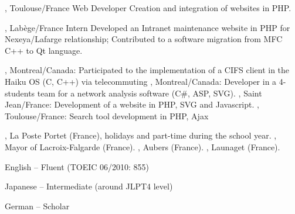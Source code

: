 \documentclass[english]{ecv}
\begin{document}
\begin{ecv}
                 {, Toulouse/France}
                 {Web Developer}
                 {Creation and integration of websites in PHP.
                 }

                 {, Lab\`ege/France}
                 {Intern
                 }
                 {Developed an Intranet maintenance website in PHP for Nexeya/Lafarge
                  relationship; Contributed to a software migration from MFC C++
                  to Qt language.
                 }

                 {, Montreal/Canada: Participated
                  to the implementation of a CIFS client in the Haiku OS (C, C++)
                  via telecommuting}
                 {, Montreal/Canada:
                 Developer in a 4-students team for a network analysis software
                 (C\#, ASP, SVG).
                 }
                 {, Saint Jean/France: Development of a
                 website in PHP, SVG and Javascript.
                 }
                 {, Toulouse/France:
                 Search tool development in PHP, Ajax
                 }

 {, La Poste Portet (France), holidays and
part-time during the school year.}
 {, Mayor of Lacroix-Falgarde (France).}
 {, Aubers (France).}
 {, Launaget (France).}


\ecvPageBreak



 {
  \begin{description}
    \begin{spacing}{-1}
    \item[English] -- Fluent (TOEIC 06/2010: 855)
    \item[Japanese] -- Intermediate (around JLPT4 level)
    \item[German] -- Scholar
    \end{spacing}
  \end{description}
}


\end{ecv}
\end{document}
